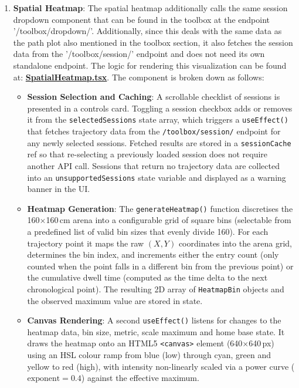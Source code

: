 \documentclass{article}
\begin{document}
\begin{enumerate}
{  to build the multi-line chart based on the data fetched from the backend.}
  \item{\textbf{Spatial Heatmap}: The spatial heatmap additionally calls the same session dropdown component that can be found in the toolbox at the endpoint '/toolbox/dropdown/'. Additionally,
  since this deals with the same data as the path plot also mentioned in the toolbox section, it also fetches the session data from the '/toolbox/session/' endpoint and does not need its own standalone endpoint.
  The logic for rendering this visualization can be found at: \href{https://github.com/OCD-Rats-Capstone/OCD-Rat-Infrastructure/blob/main/src/ocd-rat-frontend/src/pages/SpatialHeatmap.tsx}{\textbf{SpatialHeatmap.tsx}}.
  The component is broken down as follows:
    \begin{itemize}
      \item{\textbf{Session Selection and Caching}: A scrollable checklist of sessions is presented in a controls card. Toggling a session checkbox adds or removes it from the \texttt{selectedSessions} state array,
      which triggers a \texttt{useEffect()} that fetches trajectory data from the \texttt{/toolbox/session/} endpoint for any newly selected sessions. Fetched results are stored in a \texttt{sessionCache} ref
      so that re-selecting a previously loaded session does not require another API call. Sessions that return no trajectory data are collected into an \texttt{unsupportedSessions} state variable and displayed
      as a warning banner in the UI.}
      \item{\textbf{Heatmap Generation}: The \texttt{generateHeatmap()} function discretises the 160$\times$160\,cm arena into a configurable grid of square bins (selectable from a predefined list of valid bin sizes that evenly divide 160).
      For each trajectory point it maps the raw $(X, Y)$ coordinates into the arena grid, determines the bin index, and increments either the entry count (only counted when the point falls in a different bin from the previous point)
      or the cumulative dwell time (computed as the time delta to the next chronological point). The resulting 2D array of \texttt{HeatmapBin} objects and the observed maximum value are stored in state.}
      \item{\textbf{Canvas Rendering}: A second \texttt{useEffect()} listens for changes to the heatmap data, bin size, metric, scale maximum and home base state. It draws the heatmap onto an HTML5 \texttt{<canvas>} element (640$\times$640\,px)
      using an HSL colour ramp from blue (low) through cyan, green and yellow to red (high), with intensity non-linearly scaled via a power curve ($\text{exponent} = 0.4$) against the effective maximum.
}
\end{itemize}}
\end{enumerate}
\end{document}
